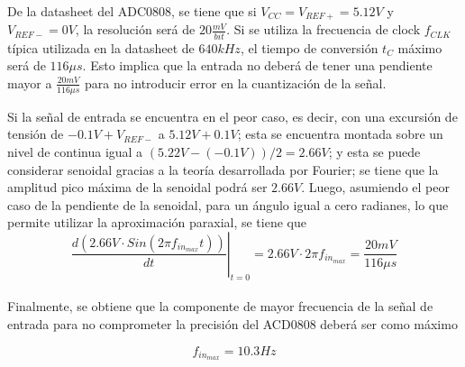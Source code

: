 De la datasheet del ADC0808, se tiene que si $V_{CC} = V_{REF+} = 5.12V$ y $V_{REF-} = 0V$, la resolución será de $20 \frac{mV}{bit}$. Si se utiliza la frecuencia de clock $f_{CLK}$ típica utilizada en la datasheet de $640kHz$, el tiempo de conversión $t_C$ máximo será de $116\mu s$. Esto implica que la entrada no deberá de tener una pendiente mayor a $\frac{20mV}{116\mu s}$ para no introducir error en la cuantización de la señal.


Si la señal de entrada se encuentra en el peor caso, es decir, con una excursión de tensión de $-0.1V + V_{REF-}$ a $5.12V + 0.1V$; esta se encuentra montada sobre un nivel de continua igual a $(5.22V - (-0.1V))/2 = 2.66V$; y esta se puede considerar senoidal gracias a la teoría desarrollada por Fourier; se tiene que la amplitud pico máxima de la senoidal podrá ser $2.66V$. Luego, asumiendo el peor caso de la pendiente de la senoidal, para un ángulo igual a cero radianes, lo que permite utilizar la aproximación paraxial, se tiene que
\\

\begin{equation}
\left. \frac{d \left( 2.66V \cdot Sin \left( 2\pi f_{in_{max}} t \right) \right)}{dt} \right|_{t=0} = 2.66V \cdot 2\pi f_{in_{max}} = \frac{20mV}{116\mu s}
\end{equation}
\\


Finalmente, se obtiene que la componente de mayor frecuencia de la señal de entrada para no comprometer la precisión del ACD0808 deberá ser como máximo

$$f_{in_{max}} = 10.3Hz$$

